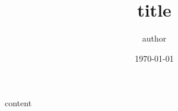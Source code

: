 \documentclass{zettel}
\title{title}
\author{author}
\date{\today}
\begin{document}
\maketitle
\tableofcontents

\newpage

{{content}}
\end{document}

